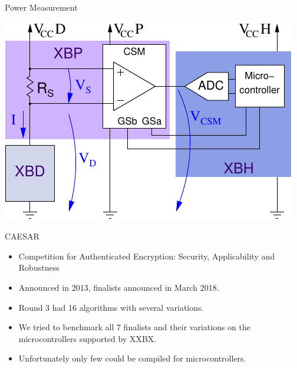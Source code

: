 \documentclass[xcolor=pdftex,dvipsnames,table,final]{beamer}
\begin{document}
\begin{frame}[fragile]{}
\begin{columns}[t, totalwidth=\textwidth]
\begin{column}{.675\linewidth}
\begin{columns}
\begin{column}{.473\linewidth}
\begin{block}{Power Measurement}
\begin{minipage}{0.48\linewidth}
          \begin{center}
            \vspace{-2ex}
            \includegraphics[scale=1.45]{../figures/ina225}
          \end{center} 
	\end{minipage} 
       \end{block}
       \begin{block}{CAESAR}
        \begin{itemize}
          \item Competition for Authenticated Encryption: Security, Applicability and Robustness
          \item Announced in 2013, finalists announced in March 2018.
          \item Round 3 had 16 algorithms with several variations.
          \item We tried to benchmark all 7 finalists and their variations on the microcontrollers supported by XXBX.
          \item Unfortunately only few could be compiled for microcontrollers.
        \end{itemize}
       \end{block}


\end{column}
\end{columns}
\end{column}
\end{columns}
\end{frame}
\end{document}
